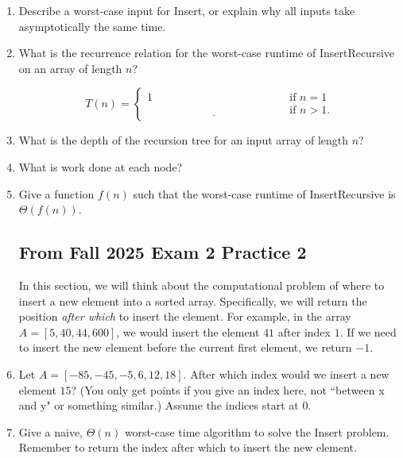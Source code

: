 \documentclass[11pt]{article}
\begin{document}
\begin{enumerate}
\newpage


\item Describe a worst-case input for Insert, or explain why
all inputs take asymptotically the same time.
\vspace{1.5in}

\item 
What is the recurrence relation for the worst-case runtime of InsertRecursive on
an array of length $n$?

    \[
T(n) = 
\begin{cases} 
      1 & \text{if } n = 1\\
      \underline{\hspace{2in}} & \text{if } n > 1.
   \end{cases}
\]

\item What is the depth of the recursion tree for an input array of length $n$?
\vspace{1in}

\item What is work done at each node?
\vspace{1in}

\item Give a function $f(n)$ such that the worst-case runtime of
InsertRecursive is $\Theta(f(n))$.


\newpage

\subsection*{From Fall 2025 Exam 2 Practice 2}
In this section, we will think about the computational problem of where to
insert a new element into a sorted array. Specifically, we will return the
position \emph{after which} to insert the element. For example, in the array
$A=[5, 40, 44, 600]$, we would insert the element $41$ after index $1$. If we
need to insert the new element before the current first element, we return $-1$.

\item Let $A=[-85, -45, -5, 6, 12, 18]$. After which index would we insert a new
element $15$? (You only get points if you give an index here, not ``between x
and y" or something similar.) Assume the indices start at $0$.

\vspace{1in}

\item Give a naive, $\Theta(n)$ worst-case time algorithm to solve the Insert
problem. Remember to return the index after which to insert the new element.


\end{enumerate}
\end{document}
